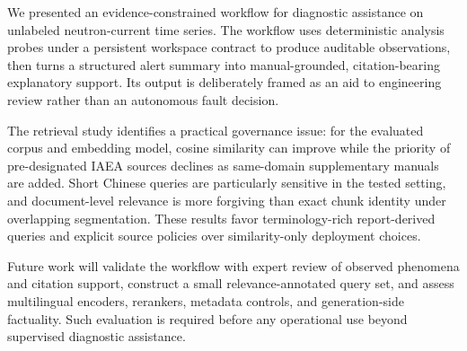 We presented an evidence-constrained workflow for diagnostic assistance on unlabeled neutron-current time series. The workflow uses deterministic analysis probes under a persistent workspace contract to produce auditable observations, then turns a structured alert summary into manual-grounded, citation-bearing explanatory support. Its output is deliberately framed as an aid to engineering review rather than an autonomous fault decision.

The retrieval study identifies a practical governance issue: for the evaluated corpus and embedding model, cosine similarity can improve while the priority of pre-designated IAEA sources declines as same-domain supplementary manuals are added. Short Chinese queries are particularly sensitive in the tested setting, and document-level relevance is more forgiving than exact chunk identity under overlapping segmentation. These results favor terminology-rich report-derived queries and explicit source policies over similarity-only deployment choices.

Future work will validate the workflow with expert review of observed phenomena and citation support, construct a small relevance-annotated query set, and assess multilingual encoders, rerankers, metadata controls, and generation-side factuality. Such evaluation is required before any operational use beyond supervised diagnostic assistance.
